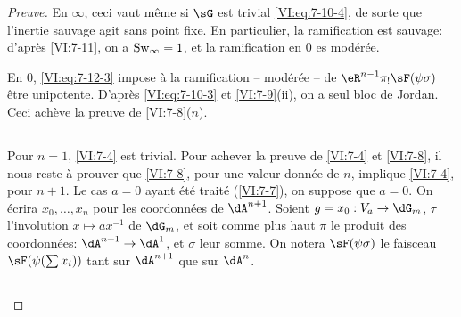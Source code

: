 \begin{proof}[Preuve]
En $\infty$, ceci vaut m\^eme si $\sG$ est trivial \eqref{VI:eq:7-10-4}, de 
sorte que l'inertie sauvage agit sans point fixe. En particulier, la 
ramification est sauvage: d'apr\`es \ref{VI:7-11}, on a $\operatorname{Sw}_\infty=1$, et la 
ramification en $0$ es mod\'er\'ee. 

En $0$, \eqref{VI:eq:7-12-3} impose \`a la ramification -- mod\'er\'ee -- de 
$\eR^{n-1} \pi_! \sF(\psi\sigma)$ \^etre unipotente. D'apr\`es 
\eqref{VI:eq:7-10-3} et \ref{VI:7-9}(ii), on a seul bloc de Jordan. Ceci 
ach\`eve la preuve de \ref{VI:7-8}($n$). 





\subsection{}\label{VI:7-13}

Pour $n=1$, \ref{VI:7-4} est trivial. Pour achever la preuve de \ref{VI:7-4} et 
\ref{VI:7-8}, il nous reste \`a prouver que \ref{VI:7-8}, pour une valeur 
donn\'ee de $n$, implique \ref{VI:7-4}, pour $n+1$. Le cas $a=0$ ayant \'et\'e 
trait\'e (\ref{VI:7-7}), on suppose que $a=0$. On \'ecrira $x_0,\dots,x_n$ pour 
les coordonn\'ees de $\dA^{n+1}$. Soient $g=x_0:V_a\to \dG_m$, $\tau$ 
l'involution $x\mapsto a x^{-1}$ de $\dG_m$, et soit comme plus haut $\pi$ le 
produit des coordonn\'ees: $\dA^{n+1} \to \dA^1$, et $\sigma$ leur somme. On 
notera $\sF(\psi\sigma)$ le faisceau $\sF(\psi(\sum x_i))$ tant sur $\dA^{n+1}$ 
que sur $\dA^n$. 





\subsection{}\label{VI:7-14}


\end{proof}
